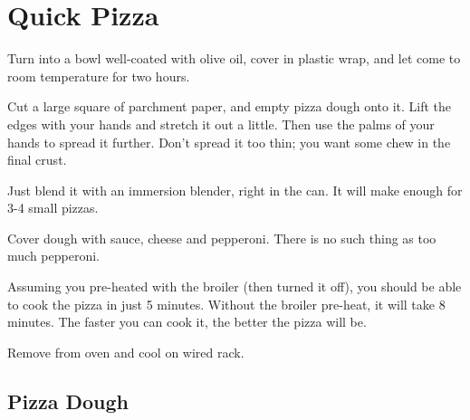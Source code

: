 \section{Quick Pizza}
\begin{recipe}



Turn into a bowl well-coated with olive oil, cover in plastic wrap, and let
come to room temperature for two hours.

Cut a large square of parchment paper, and empty pizza dough onto it. Lift the
edges with your hands and stretch it out a little. Then use the palms of your
hands to spread it further. Don't spread it too thin; you want some chew in
the final crust.


Just blend it with an immersion blender, right in the can. It will make enough
for 3-4 small pizzas.


Cover dough with sauce, cheese and pepperoni. There is no such thing as too much
pepperoni.

Assuming you pre-heated with the broiler (then turned it off), you should be able
to cook the pizza in just 5 minutes. Without the broiler pre-heat, it will take
8 minutes. The faster you can cook it, the better the pizza will be.

Remove from oven and cool on wired rack.

\subsection{Pizza Dough}


\end{recipe}
